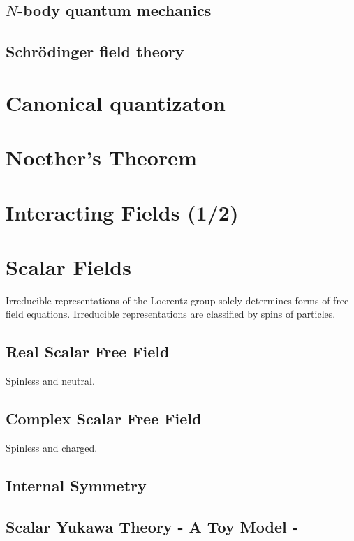 \documentclass[12pt]{article}
\newcommand{\myqftsrcdirectory}[0]{myqft/src}
\newcommand{\mainqftsrcdirectory}[0]{src_qft}
\newcommand{\srcseventeen}[0]{myqft/versions/2017}
\begin{document}
\subsection{$N$-body quantum mechanics}

\subsection{Schr\"odinger field theory}

\section{Canonical quantizaton}

\section{Noether's Theorem}

\section{Interacting Fields (1/2)}


\section{Scalar Fields}
Irreducible representations of the Loerentz group solely 
determines forms of free field equations.
Irreducible representations are classified by
spins of particles.
\subsection{Real Scalar Free Field}
Spinless and neutral.
%

\subsection{Complex Scalar Free Field}
Spinless and charged.

\subsection{Internal Symmetry}

\subsection{Scalar Yukawa Theory - A Toy Model -}

\end{document}
